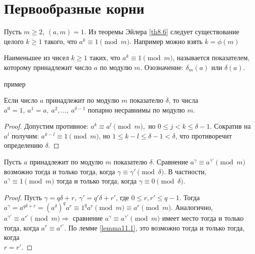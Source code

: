 \section{Первообразные корни}
    Пусть $m\geq 2,\ (a,m)=1$. Из теоремы Эйлера \eqref{th8.6} следует существование целого $k\geq 1$ такого, что $a^k\equiv 1\pmod{m}$. Например можно взять $k=\phi(m)$
    \begin{definition}
        Наименьшее из чисел $k\geq 1$ таких, что $a^k\equiv 1\pmod{m}$, называется показателем, которому принадлежит число $a$ по модулю $m$. Озозначение: $\delta_m(a)$ или $\delta(a)$.
    \end{definition} 
    пример
    \begin{lemma}\label{lemma11.1}
        Если число $a$ принадлежит по модулю $m$ показателю $\delta$, то числа $a^0=1,\ a^1=a,\ a^2,\dots,\ a^{\delta-1}$ попарно несравнимы по модулю $m$.
    \end{lemma} 
    \begin{proof}
        Допустим противное: $a^k\equiv a^l \pmod{m}$,\ но $0\leq j<k\leq \delta-1$. Сократив на $a^l$ получим: $a^{k-l}\equiv 1\pmod{m}$, но $1\leq k-l\leq \delta-1<\delta$, что противоречит определению $\delta$.
    \end{proof} 
    \begin{lemma}\label{lemma11.2}
        Пусть $a$ принадлежит по модулю $m$ показателю $\delta$. Сравнение $a^{\gamma}\equiv a^{\gamma'}\pmod{m}$ возможно тогда и только тогда, когда $\gamma\equiv \gamma'\pmod{\delta}$. В частности, $a^{\gamma}\equiv 1\pmod{m}$ тогда и только тогда, когда $\gamma\equiv 0\pmod{\delta}$.
    \end{lemma} 
    \begin{proof}
        Пусть $\gamma=q\delta+r,\ \gamma'=q'\delta+r'$, где $0\leq r,r'\leq q-1$. Тогда $a^{\gamma}=a^{q\delta+r}=(a^{\delta})^q a^r\equiv 1^qa^r\pmod{m}\equiv a^r\pmod{m}$. Аналогично, \\
        $a^{\gamma'} \equiv a^{r'}\pmod{m} \Rightarrow$ сравнение $a^{\gamma}\equiv a^{\gamma'}\pmod{m}$ имеет место тогда и только тогда, когда $a^r\equiv a^{r'}$. По лемме \ref{lemma11.1}, это возможно тогда и только тогда, когда\\
        $r=r'$.
    \end{proof} 
